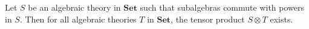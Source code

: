 Let $S$ be an algebraic theory in $\mathbf{Set}$ such that subalgebras commute with powers in $S$. Then for all algebraic theories $T$ in $\mathbf{Set}$, the tensor product $S \otimes T$ exists.
